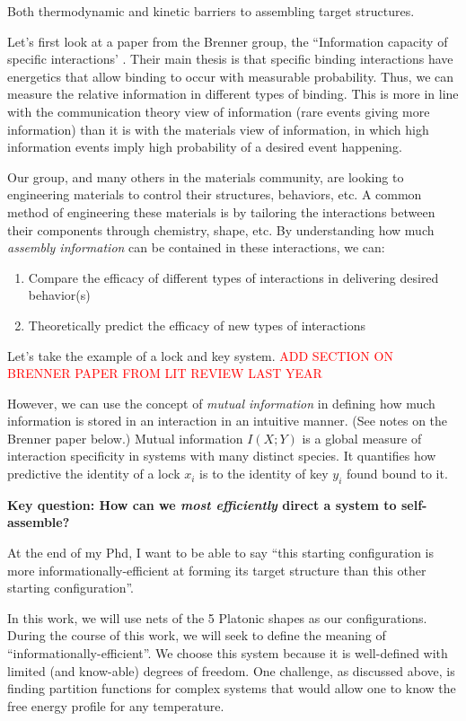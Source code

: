 
Both thermodynamic and kinetic barriers to assembling target structures.

Let's first look at a paper from the Brenner group, the ``Information capacity of specific interactions' \cite{Huntley_2016_PNAS}.
Their main thesis is that specific binding interactions have energetics that allow binding to occur with measurable probability.
Thus, we can measure the relative information in different types of binding.
This is more in line with the communication theory view of information (rare events giving more information) than it is with the materials view of information, in which high information events imply high probability of a desired event happening.

Our group, and many others in the materials community, are looking to engineering materials to control their structures, behaviors, etc.
A common method of engineering these materials is by tailoring the interactions between their components through chemistry, shape, etc.
By understanding how much \textit{assembly information} can be contained in these interactions, we can:
\begin{enumerate}
\item Compare the efficacy of different types of interactions in delivering desired behavior(s)
\item Theoretically predict the efficacy of new types of interactions
\end{enumerate}

Let's take the example of a lock and key system.
\textcolor{red}{ADD SECTION ON BRENNER PAPER FROM LIT REVIEW LAST YEAR}

However, we can use the concept of \textit{mutual information} in defining how much information is stored in an interaction in an intuitive manner.
(See notes on the Brenner paper below.)
Mutual information $I(X;Y)$ is a global measure of interaction specificity in systems with many distinct species.
It quantifies how predictive the identity of a lock $x_i$ is to the identity of key $y_i$ found bound to it.


\textbf{Key question: How can we \textit{most efficiently} direct a system to self-assemble?}

At the end of my Phd, I want to be able to say ``this starting configuration is more informationally-efficient at forming its target structure than this other starting configuration''.

In this work, we will use nets of the 5 Platonic shapes as our configurations.
During the course of this work, we will seek to define the meaning of ``informationally-efficient''.
We choose this system because it is well-defined with limited (and know-able) degrees of freedom.
One challenge, as discussed above, is finding partition functions for complex systems that would allow one to know the free energy profile for any temperature.